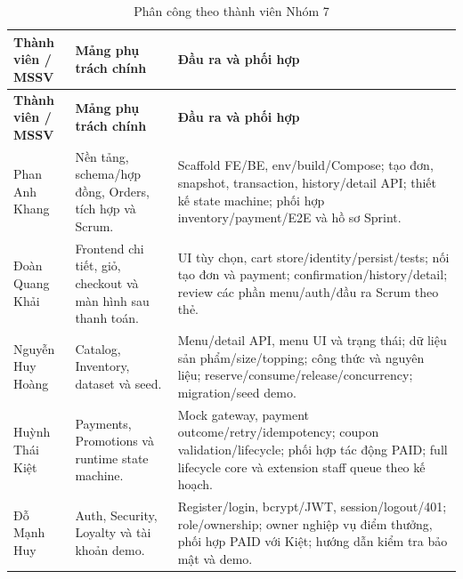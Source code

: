 {\small{}
\begin{longtable}{@{}L{0.22\textwidth}L{0.33\textwidth}L{0.38\textwidth}@{}}
\caption{Phân công theo thành viên Nhóm 7}\label{tab:assignment}\\
\toprule\textbf{Thành viên / MSSV} & \textbf{Mảng phụ trách chính} & \textbf{Đầu ra và phối hợp} \\\midrule\endfirsthead
\toprule\textbf{Thành viên / MSSV} & \textbf{Mảng phụ trách chính} & \textbf{Đầu ra và phối hợp} \\\midrule\endhead
\bottomrule\endfoot
Phan Anh Khang & Nền tảng, schema/hợp đồng, Orders, tích hợp và Scrum. & Scaffold FE/BE, env/build/Compose; tạo đơn, snapshot, transaction, history/detail API; thiết kế state machine; phối hợp inventory/payment/E2E và hồ sơ Sprint. \\
Đoàn Quang Khải & Frontend chi tiết, giỏ, checkout và màn hình sau thanh toán. & UI tùy chọn, cart store/identity/persist/tests; nối tạo đơn và payment; confirmation/history/detail; review các phần menu/auth/đầu ra Scrum theo thẻ. \\
Nguyễn Huy Hoàng & Catalog, Inventory, dataset và seed. & Menu/detail API, menu UI và trạng thái; dữ liệu sản phẩm/size/topping; công thức và nguyên liệu; reserve/consume/release/concurrency; migration/seed demo. \\
Huỳnh Thái Kiệt & Payments, Promotions và runtime state machine. & Mock gateway, payment outcome/retry/idempotency; coupon validation/lifecycle; phối hợp tác động PAID; full lifecycle core và extension staff queue theo kế hoạch. \\
Đỗ Mạnh Huy & Auth, Security, Loyalty và tài khoản demo. & Register/login, bcrypt/JWT, session/logout/401; role/ownership; owner nghiệp vụ điểm thưởng, phối hợp PAID với Kiệt; hướng dẫn kiểm tra bảo mật và demo. \\
\end{longtable}}


